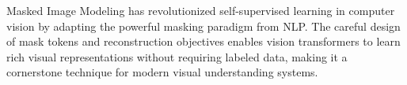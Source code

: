 Masked Image Modeling has revolutionized self-supervised learning in computer vision by adapting the powerful masking paradigm from NLP. The careful design of mask tokens and reconstruction objectives enables vision transformers to learn rich visual representations without requiring labeled data, making it a cornerstone technique for modern visual understanding systems.